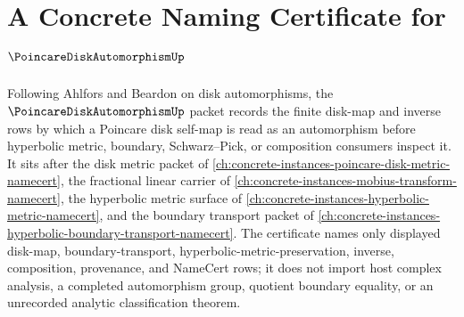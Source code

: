 \chapter{A Concrete Naming Certificate for $\PoincareDiskAutomorphismUp$}
\label{ch:concrete-instances-poincare-disk-automorphism-namecert}

Following Ahlfors and Beardon on disk automorphisms, the
$\PoincareDiskAutomorphismUp$ packet records the finite disk-map and inverse
rows by which a Poincare disk self-map is read as an automorphism before
hyperbolic metric, boundary, Schwarz--Pick, or composition consumers inspect
it. It sits after the disk metric packet of
\autoref{ch:concrete-instances-poincare-disk-metric-namecert}, the fractional
linear carrier of \autoref{ch:concrete-instances-mobius-transform-namecert},
the hyperbolic metric surface of
\autoref{ch:concrete-instances-hyperbolic-metric-namecert}, and the boundary
transport packet of
\autoref{ch:concrete-instances-hyperbolic-boundary-transport-namecert}. The
certificate names only displayed disk-map, boundary-transport,
hyperbolic-metric-preservation, inverse, composition, provenance, and
NameCert rows; it does not import host complex analysis, a completed
automorphism group, quotient boundary equality, or an unrecorded analytic
classification theorem.

